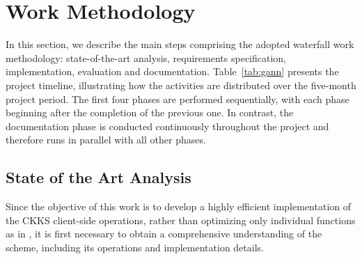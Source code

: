 \chapter{Work Methodology} \label{cap:metodo}

In this section, we describe the main steps comprising the adopted waterfall work methodology: state-of-the-art analysis, requirements specification, implementation, evaluation and documentation. Table~\ref{tab:gann} presents the project timeline, illustrating how the activities are distributed over the five-month project period. The first four phases are performed sequentially, with each phase beginning after the completion of the previous one. In contrast, the documentation phase is conducted continuously throughout the project and therefore runs in parallel with all other phases.

\begin{table}[!ht]
\centering
\label{tab:gann}
\end{table}

\section{State of the Art Analysis}
\label{metodo:soa}

Since the objective of this work is to develop a highly efficient implementation of the CKKS client-side operations, rather than optimizing only individual functions as in \cite{wang2023he,chen2026hi}, it is first necessary to obtain a comprehensive understanding of the scheme, including its operations and implementation details.

